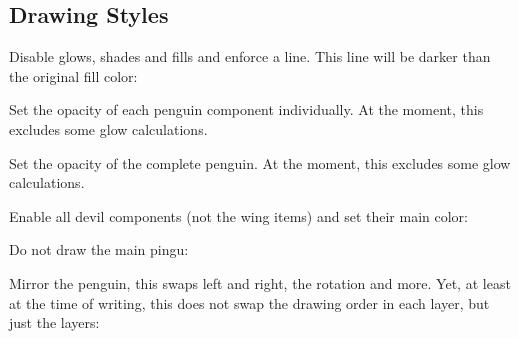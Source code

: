 \documentclass[parskip=half,english,numbers=noenddot,footnotes=nomultiple,oneside]{scrartcl}
\def\cursub{}
\begin{document}
\subsection{Drawing Styles}
\def\cursub{Styles!}
	Disable glows, shades and fills and enforce a line. This line will be darker
	than the original fill color:
\begin{tcblisting}{}
\begin{tikzpicture}
	\pingu[:line]
\end{tikzpicture}
\end{tcblisting}
\endkeyexplain

	Set the opacity of each penguin component individually. At the moment, this
	excludes some glow calculations.
\begin{tcblisting}{}
\end{tcblisting}
\endkeyexplain

	Set the opacity of the complete penguin. At the moment, this
	excludes some glow calculations.
\begin{tcblisting}{}
\begin{tikzpicture}
	\pingu[:ghost]
\end{tikzpicture}
\end{tcblisting}
\endkeyexplain

	Enable all devil components (not the wing items) and set their main color:
\begin{tcblisting}{}
\begin{tikzpicture}
	\pingu[:devil=green]
\end{tikzpicture}
\end{tcblisting}
\endkeyexplain


	Do not draw the main pingu:
\begin{tcblisting}{}
\end{tcblisting}
\endkeyexplain

	Mirror the penguin, this swaps left and right, the rotation and more.
	Yet, at least at the time of writing, this does not swap the drawing order in each layer, but just the layers:
\begin{tcblisting}{}
\begin{tikzpicture}
	\pingu[:back, left wing wave,
	       cane left, left item angle=70]
\end{tikzpicture}
\end{tcblisting}
\endkeyexplain
\end{document}
